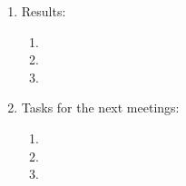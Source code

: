 \begin{enumerate}
	\item Results:
	\begin{enumerate}
		
		\item 
		
		\item 
		
        \item 
		
	\end{enumerate}
	
	\item Tasks for the next meetings:
	\begin{enumerate}
		
		\item 
		
		\item 
		
        \item 
			
	\end{enumerate}
\end{enumerate}
\fillpage

